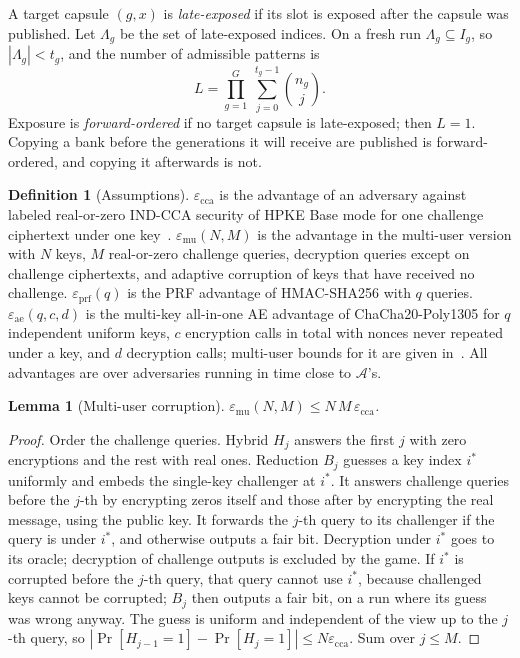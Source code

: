 \documentclass[pdflatex,sn-mathphys-num]{sn-jnl}
\theoremstyle{plain}
\newtheorem{lemma}[theorem]{Lemma}
\theoremstyle{definition}
\newtheorem{definition}[theorem]{Definition}
\begin{document}
A target capsule $(g,x)$ is \emph{late-exposed} if its slot is exposed after the capsule was published. Let $\Lambda_g$ be the set of late-exposed indices. On a fresh run $\Lambda_g\subseteq I_g$, so $|\Lambda_g|<t_g$, and the number of admissible patterns is
\begin{equation}\label{eq:L}
 L=\prod_{g=1}^{G}\ \sum_{j=0}^{t_g-1}\binom{n_g}{j}.
\end{equation}
Exposure is \emph{forward-ordered} if no target capsule is late-exposed; then $L=1$. Copying a bank before the generations it will receive are published is forward-ordered, and copying it afterwards is not.

\begin{definition}[Assumptions]
$\varepsilon_{\mathrm{cca}}$ is the advantage of an adversary against labeled real-or-zero IND-CCA security of HPKE Base mode for one challenge ciphertext under one key~\cite{rfc9180,alwen2021}. $\varepsilon_{\mathrm{mu}}(N,M)$ is the advantage in the multi-user version with $N$ keys, $M$ real-or-zero challenge queries, decryption queries except on challenge ciphertexts, and adaptive corruption of keys that have received no challenge. $\varepsilon_{\mathrm{prf}}(q)$ is the PRF advantage of HMAC-SHA256 with $q$ queries. $\varepsilon_{\mathrm{ae}}(q,c,d)$ is the multi-key all-in-one AE advantage of ChaCha20-Poly1305 for $q$ independent uniform keys, $c$ encryption calls in total with nonces never repeated under a key, and $d$ decryption calls; multi-user bounds for it are given in~\cite{degabriele2021}. All advantages are over adversaries running in time close to $\mathcal A$'s.
\end{definition}

\begin{lemma}[Multi-user corruption]\label{lem:mu}
$\varepsilon_{\mathrm{mu}}(N,M)\le N\,M\,\varepsilon_{\mathrm{cca}}$.
\end{lemma}
\begin{proof}
Order the challenge queries. Hybrid $H_j$ answers the first $j$ with zero encryptions and the rest with real ones. Reduction $B_j$ guesses a key index $i^*$ uniformly and embeds the single-key challenger at $i^*$. It answers challenge queries before the $j$-th by encrypting zeros itself and those after by encrypting the real message, using the public key. It forwards the $j$-th query to its challenger if the query is under $i^*$, and otherwise outputs a fair bit. Decryption under $i^*$ goes to its oracle; decryption of challenge outputs is excluded by the game. If $i^*$ is corrupted before the $j$-th query, that query cannot use $i^*$, because challenged keys cannot be corrupted; $B_j$ then outputs a fair bit, on a run where its guess was wrong anyway. The guess is uniform and independent of the view up to the $j$-th query, so $|\Pr[H_{j-1}=1]-\Pr[H_j=1]|\le N\varepsilon_{\mathrm{cca}}$. Sum over $j\le M$.
\end{proof}
\end{document}
